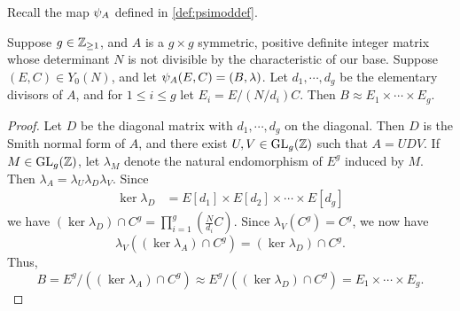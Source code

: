 \documentclass{amsart}
\begin{document}
Recall the map $\psi_{A}$ defined in \eqref{def:psimoddef}.

\begin{lemma}\label{lem:psimod-weakly-isomorphic-to-product}
Suppose $g\in\mathbb{Z}_{\ge 1}$, and $A$ is a $g \times g$ symmetric, positive definite integer matrix whose determinant $N$ is not divisible by the characteristic of our base. %
Suppose $(E,C) \in Y_0(N)$, and let $\psi_{A}(E,C) = (B,\lambda)$.  Let $d_1, \cdots, d_g$ be the elementary divisors of $A$, and for $1 \le i \le g$ let $E_i = E/(N/d_i)C$. Then
$
    B \approx E_1 \times \cdots \times E_g.
$
\end{lemma}

\begin{proof}
  Let $D$ be the diagonal matrix with $d_1, \cdots, d_g$ on the diagonal.
Then $D$ is the Smith normal form of $A$, and there exist $U,V \in \operatorname{GL}_g(\mathbb{Z})$ such that $A = UDV$.
If $M \in \operatorname{GL}_g(\mathbb{Z})$, let $\lambda_M$ denote the natural endomorphism of $E^g$ induced by $M$.
Then %
$\lambda_A = \lambda_U \lambda_D \lambda_V$. Since
  \begin{align*}
    \ker \lambda_D &= E[d_1] \times E[d_2] \times \cdots \times E[d_g]
  \end{align*}
  we have $(\ker \lambda_D) \cap C^g = \prod_{i=1}^g (\frac{N}{d_i}C)$.
 Since $\lambda_V(C^g) = C^g$, we now have
  \[
    \lambda_V((\ker \lambda_A) \cap C^g) = (\ker \lambda_D) \cap C^g.
  \]
  Thus,
  $$
  B = E^g/((\ker \lambda_A) \cap C^g) \approx E^g/((\ker \lambda_D) \cap C^g) = E_1 \times \cdots \times E_g.
  $$
\end{proof}
\end{document}
